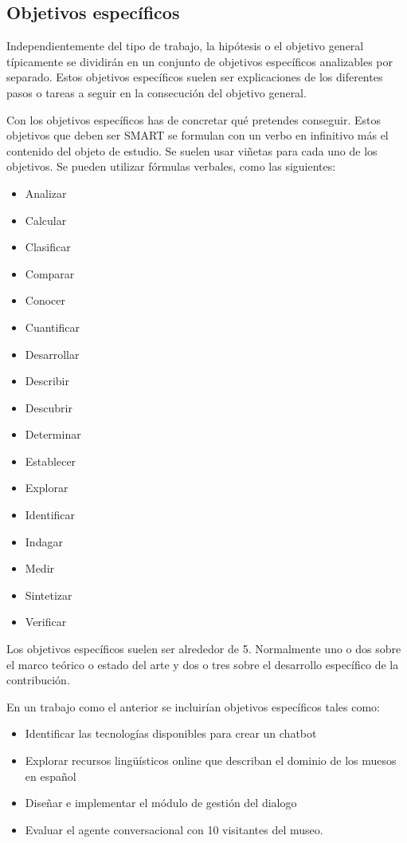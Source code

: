 \subsection{Objetivos específicos}

Independientemente del tipo de trabajo, la hipótesis o el objetivo general típicamente se dividirán en un conjunto de objetivos específicos analizables por separado. Estos objetivos específicos suelen ser explicaciones de los diferentes pasos o tareas a seguir en la consecución del objetivo general.

Con los objetivos específicos has de concretar qué pretendes conseguir. Estos objetivos que deben ser SMART se formulan con un verbo en infinitivo más el contenido del objeto de estudio. Se suelen usar viñetas para cada uno de los objetivos. Se pueden utilizar fórmulas verbales, como las siguientes:
\begin{itemize}
	\item Analizar
	\item Calcular
	\item Clasificar
	\item Comparar
	\item Conocer
	\item Cuantificar
	\item Desarrollar
	\item Describir
	\item Descubrir
	\item Determinar
	\item Establecer
	\item Explorar
	\item Identificar
	\item Indagar
	\item Medir
	\item Sintetizar
	\item Verificar
\end{itemize}

Los objetivos específicos suelen ser alrededor de 5. Normalmente uno o dos sobre el marco teórico o estado del arte y dos o tres sobre el desarrollo específico de la contribución.

En un trabajo como el anterior se incluirían objetivos específicos tales como:
\begin{itemize}
\item Identificar las tecnologías disponibles para crear un chatbot
\item Explorar recursos lingüísticos online que describan el dominio de los muesos en español
\item Diseñar e implementar el módulo de gestión del dialogo
\item Evaluar el agente conversacional con 10 visitantes del museo.
\end{itemize}

